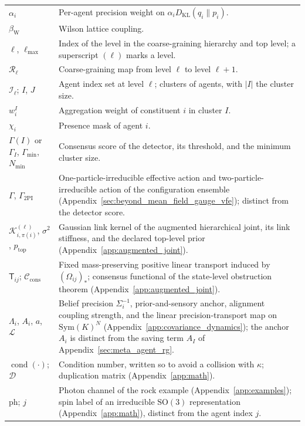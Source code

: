 {\begin{longtable}{@{}p{}p{}@{}}
$\alpha_i$ & Per-agent precision weight on $\alpha_iD_{\mathrm{KL}}(q_i\|p_i)$. \\
$\beta_{\mathrm{W}}$ & Wilson lattice coupling. \\
$\ell$, $\ell_{\max}$ & Index of the level in the coarse-graining hierarchy and top level; a superscript $(\ell)$ marks a level. \\
$\mathcal{R}_\ell$ & Coarse-graining map from level $\ell$ to level $\ell+1$. \\
$\mathcal{I}_\ell$; $I$, $J$ & Agent index set at level $\ell$; clusters of agents, with $|I|$ the cluster size. \\
$w_i^I$ & Aggregation weight of constituent $i$ in cluster $I$. \\
$\chi_i$ & Presence mask of agent $i$. \\
$\Gamma(I)$ or $\Gamma_I$, $\Gamma_{\min}$, $N_{\min}$ & Consensus score of the detector, its threshold, and the minimum cluster size. \\
$\Gamma$, $\Gamma_{\mathrm{2PI}}$ & One-particle-irreducible effective action and two-particle-irreducible action of the configuration ensemble (Appendix~\ref{sec:beyond_mean_field_gauge_vfe}); distinct from the detector score. \\
$\mathcal{K}^{(\ell)}_{i,\pi(i)}$, $\sigma^2$, $p_{\mathrm{top}}$ & Gaussian link kernel of the augmented hierarchical joint, its link stiffness, and the declared top-level prior (Appendix~\ref{app:augmented_joint}). \\
$\mathsf{T}_{ij}$; $\mathcal{C}_{\mathrm{cons}}$ & Fixed mass-preserving positive linear transport induced by $(\Omega_{ij})_*$; consensus functional of the state-level obstruction theorem (Appendix~\ref{app:augmented_joint}). \\
$\Lambda_i$, $A_i$, $a$, $\mathcal{L}$ & Belief precision $\Sigma_i^{-1}$, prior-and-sensory anchor, alignment coupling strength, and the linear precision-transport map on $\mathrm{Sym}(K)^N$ (Appendix~\ref{app:covariance_dynamics}); the anchor $A_i$ is distinct from the saving term $A_I$ of Appendix~\ref{sec:meta_agent_rg}. \\
$\operatorname{cond}(\cdot)$; $\mathcal{D}$ & Condition number, written so to avoid a collision with $\kappa$; duplication matrix (Appendix~\ref{app:math}). \\
$\mathrm{ph}$; $j$ & Photon channel of the rock example (Appendix~\ref{app:examples}); spin label of an irreducible $\mathrm{SO}(3)$ representation (Appendix~\ref{app:math}), distinct from the agent index $j$. \\

\end{longtable}}
